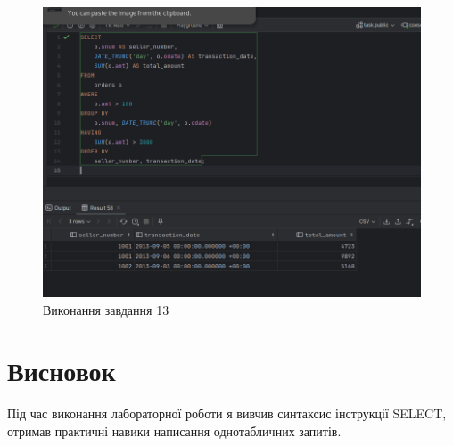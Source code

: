 \documentclass[14pt]{extreport}
\begin{document}
\begin{normalsize}
	\begin{figure}[H]
		\centering
		\includegraphics[scale=0.45]{13}
		\caption{Виконання завдання 13}
	\end{figure}
	\section*{Висновок}
	Під час виконання лабораторної роботи я вивчив синтаксис інструкції SELECT, отримав практичні навики
	написання однотабличних запитів.
	 
\end{normalsize}
\end{document}
